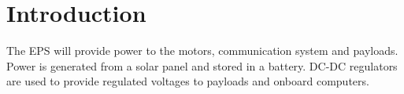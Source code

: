 \section{Introduction}
\label{sec:introduction}

The \ac{EPS} will provide power to the motors, communication system and payloads. Power is generated from a solar panel and stored in a battery. DC-DC regulators are used to provide regulated voltages to payloads and onboard computers.
